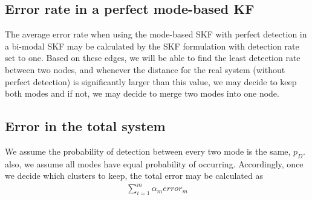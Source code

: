 \documentclass[journal]{IEEEtran}
\begin{document}


\subsection{Error rate in a perfect mode-based KF} 

The average error rate when using the mode-based SKF with perfect detection in a bi-modal SKF may be calculated by the SKF formulation with detection rate set to one. Based on these edges, we will be able to find the least detection rate between two nodes, and whenever the distance for the real system (without perfect detection) is significantly larger than this value, we may decide to keep both modes and if not, we may decide to merge two modes into one node.

\subsection{Error in the total system }
We assume the probability of detection between every two mode is the same, $p_D$. also, we assume all modes have equal probability of occurring. Accordingly, once we decide which clusters to keep, the total error may be calculated as 
\begin{align}
    \sum_{i=1}^m\alpha_m error_m
\end{align}
\end{document}
